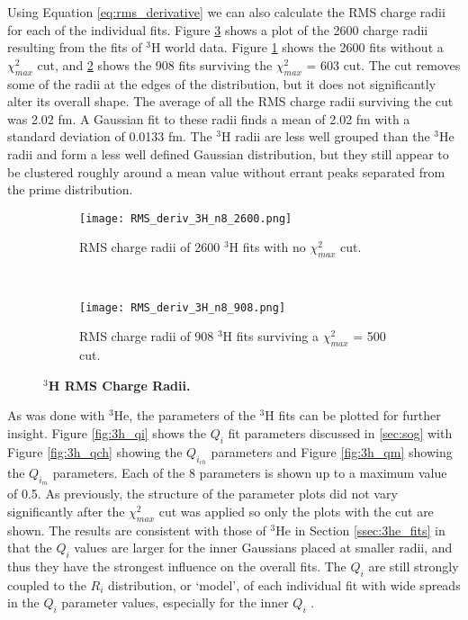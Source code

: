 Using Equation \ref{eq:rms_derivative} we can also calculate the RMS charge radii for each of the individual fits. Figure \ref{fig:3h_rms_deriv} shows a plot of the 2600 charge radii resulting from the fits of $^3$H world data. Figure \ref{fig:3h_rms_deriv_no_cut} shows the 2600 fits without a $\chi^2_{max}$ cut, and \ref{fig:3h_rms_deriv_cut} shows the 908 fits surviving the $\chi^2_{max}$ = 603 cut. The cut removes some of the radii at the edges of the distribution, but it does not significantly alter its overall shape. The average of all the RMS charge radii surviving the cut was 2.02 fm. A Gaussian fit to these radii finds a mean of 2.02 fm with a standard deviation of 0.0133 fm. The $^3$H radii are less well grouped than the $^3$He radii and form a less well defined Gaussian distribution, but they still appear to be clustered roughly around a mean value without errant peaks separated from the prime distribution.%

\begin{figure}[!ht]
\begin{subfigure}{1.\textwidth}
  \centering
  \texttt{[image: RMS\_deriv\_3H\_n8\_2600.png]}
  \caption{RMS charge radii of 2600 $^3$H fits with no $\chi^2_{max}$ cut.}
  \label{fig:3h_rms_deriv_no_cut}
\end{subfigure}\\
\begin{subfigure}{1.\textwidth}
  \centering
  \texttt{[image: RMS\_deriv\_3H\_n8\_908.png]}
  \caption{RMS charge radii of 908 $^3$H fits surviving a $\chi^2_{max}$ = 500 cut.}
  \label{fig:3h_rms_deriv_cut}
\end{subfigure}
\caption[$^3$H RMS Charge Radii]{\bf{$^3$H RMS Charge Radii.}}
\label{fig:3h_rms_deriv}
\end{figure}

As was done with $^3$He, the parameters of the $^3$H fits can be plotted for further insight. Figure \ref{fig:3h_qi} shows the $Q_i$ fit parameters discussed in \ref{sec:sog} with Figure \ref{fig:3h_qch} showing the $Q_{i_{ch}}$ parameters and Figure \ref{fig:3h_qm} showing the $Q_{i_{m}}$ parameters. Each of the 8 parameters is shown up to a maximum value of 0.5. As previously, the structure of the parameter plots did not vary significantly after the $\chi^2_{max}$ cut was applied so only the plots with the cut are shown. The results are consistent with those of $^3$He in Section \ref{ssec:3he_fits} in that the $Q_i$ values are larger for the inner Gaussians placed at smaller radii, and thus they have the strongest influence on the overall fits. The $Q_i$ are still strongly coupled to the $R_i$ distribution, or `model', of each individual fit with wide spreads in the $Q_i$ parameter values, especially for the inner $Q_i$ .

